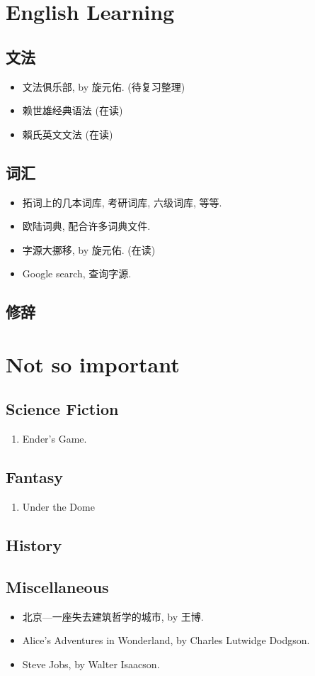 \documentclass{article}
\begin{document}
\section{English Learning}
\subsection{文法}
\begin{itemize}
    \item 文法俱乐部, by 旋元佑. (待复习整理)
    \item 赖世雄经典语法 (在读)
    \item 賴氏英文文法 (在读)
\end{itemize}
\subsection{词汇}
\begin{itemize}
    \item 拓词上的几本词库, 考研词库, 六级词库, 等等.
    \item 欧陆词典, 配合许多词典文件.
    \item 字源大挪移, by 旋元佑. (在读)
    \item Google search, 查询字源.
\end{itemize}
\subsection{修辞}
\section{Not so important}
\subsection{Science Fiction}
\begin{enumerate}
    \item Ender's Game.
\end{enumerate}
\subsection{Fantasy}
\begin{enumerate}
    \item Under the Dome
\end{enumerate}
\subsection{History}

\subsection{Miscellaneous}
\begin{itemize}
    \item 北京---一座失去建筑哲学的城市, by 王博.
    \item Alice's Adventures in Wonderland, by Charles Lutwidge Dodgson.
    \item Steve Jobs, by Walter Isaacson.
\end{itemize}
\end{document}
